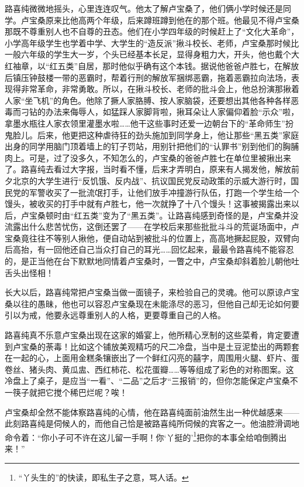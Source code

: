 \par 路喜纯微微地摇头，心里连连叹气。他太了解卢宝桑了，他们俩小学时候还是同学。卢宝桑原来比他高两个年级，后来蹲班蹲到他在的那个班。他最见不得卢宝桑那既不尊重别人也不自尊的丑态。他们在小学四年级的时候赶上了“文化大革命”，小学高年级学生也学着中学、大学生的“造反派”揪斗校长、老师，卢宝桑那时候比一般六年级的学生大一岁，个头已经基本长足，显得身粗力大，开头，他也戴个大红袖章，以“红五类”自居，那时他似乎确有这个本钱。据说他爸爸卢胜七，在解放后镇压钟鼓楼一带的恶霸时，帮着行刑的解放军捆绑恶霸，拖着恶霸拉向法场，表现得非常革命，非常勇敢。所以，在揪斗校长、老师的批斗会上，他总扮演那揪着人家“坐飞机”的角色。他除了撅人家胳膊、按人家脑袋，还要想出其他各种各样恶毒而刁钻的办法来侮辱人，如猛踩人家脚背啦，揪耳朵让人家偏仰着脸“示众”啦，拿墨水瓶往人家衣领里灌墨水啦……他干这些事时还爱一边朝台下的“革命师生”扮鬼脸儿。后来，他更把这种虐待狂的劲头施加到同学身上，他让那些“黑五类”家庭出身的同学用脑门顶着墙上的钉子罚站，用别针把他们的“认罪书”别到他们的胸脯肉上。可是，过了没多久，不知怎么的，卢宝桑的爸爸卢胜七在单位里被揪出来了。路喜纯去看过大字报，当时看不懂，后来才弄明白，原来有人揭发他，解放前夕北京的大学生进行“反饥饿、反内战”、抗议国民党反动政策的示威大游行时，国民党的军警收买了一批流氓打手，让他们放手冲撞游行队伍，打跑一个学生给一个馒头，被收买的打手中就有卢胜七，他一次就挣了十八个馒头！这事被揭露出来以后，卢宝桑顿时由“红五类”变为了“黑五类”。让路喜纯感到奇怪的是，卢宝桑并没流露出什么悲苦忧伤，这倒还罢了——在学校后来那些批批斗斗的荒诞场面中，卢宝桑竟往往不等别人揪他，便自动站到被批斗的位置上，高高地撅起屁股，双臂向后高抬，有一回他还自己当众打自己的耳光……回忆起来，最最令路喜纯不能容忍的，是正当他在台下默默地同情着卢宝桑时，一瞥之中，卢宝桑却斜着脸儿朝他吐舌头出怪相！
\par 长大以后，路喜纯常把卢宝桑当做一面镜子，来检验自己的灵魂。他可以原谅卢宝桑以往的愚昧，他也可以容忍卢宝桑现在未能涤尽的恶习，但他自己却无论如何要引以为戒，他要永远尊重别人的人格，更要尊重自己的人格。
\par 路喜纯真不乐意卢宝桑出现在这家的婚宴上，他所精心烹制的这些菜肴，肯定要遭到卢宝桑的荼毒！比如这个铺放美观精巧的尺二冷盘，当中是土豆泥垫出的两颗套在一起的心，上面用金糕条镶嵌出了一个鲜红闪亮的囍字，周围用火腿、虾片、蛋卷丝、猪头肉、黄瓜盅、西红柿花、松花蛋瓣……等等组成了彩色的对称图案。这冷盘上了桌子，是应当“一看”、“二品”之后才“三报销”的，但你怎能保定卢宝桑不一筷子就把它搅个稀巴烂呢？唉！
\par 卢宝桑却全然不能体察路喜纯的心情，他在路喜纯面前油然生出一种优越感来——此刻路喜纯是伺候人的，而他自己恰是被路喜纯所伺候的宾客之一。他油腔滑调地命令着：“你小子可不许在这儿留一手啊！你‘丫挺的’\footnote{“丫头生的”的快读，即私生子之意，骂人话。}把你的本事全给咱倒腾出来！”

